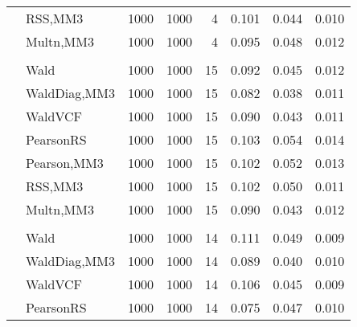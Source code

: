 \documentclass[
]{article}
\begin{document}
\begin{table}[H]
{\begin{tabular}[t]{llrrrrrr}
\hspace{1em} & RSS,MM3 & 1000 & 1000 & 4 & 0.101 & 0.044 & 0.010\\

\hspace{1em} & Multn,MM3 & 1000 & 1000 & 4 & 0.095 & 0.048 & 0.012\\
\cmidrule{1-8}
\addlinespace[0.3em]
\multicolumn{8}{l}{\textbf{1F 15V}}\\
\hspace{1em} & Wald & 1000 & 1000 & 15 & 0.092 & 0.045 & 0.012\\

\hspace{1em} & WaldDiag,MM3 & 1000 & 1000 & 15 & 0.082 & 0.038 & 0.011\\

\hspace{1em} & WaldVCF & 1000 & 1000 & 15 & 0.090 & 0.043 & 0.011\\

\hspace{1em} & PearsonRS & 1000 & 1000 & 15 & 0.103 & 0.054 & 0.014\\

\hspace{1em} & Pearson,MM3 & 1000 & 1000 & 15 & 0.102 & 0.052 & 0.013\\

\hspace{1em} & RSS,MM3 & 1000 & 1000 & 15 & 0.102 & 0.050 & 0.011\\

\hspace{1em} & Multn,MM3 & 1000 & 1000 & 15 & 0.090 & 0.043 & 0.012\\
\cmidrule{1-8}
\addlinespace[0.3em]
\multicolumn{8}{l}{\textbf{2F 10V}}\\
\hspace{1em} & Wald & 1000 & 1000 & 14 & 0.111 & 0.049 & 0.009\\

\hspace{1em} & WaldDiag,MM3 & 1000 & 1000 & 14 & 0.089 & 0.040 & 0.010\\

\hspace{1em} & WaldVCF & 1000 & 1000 & 14 & 0.106 & 0.045 & 0.009\\

\hspace{1em} & PearsonRS & 1000 & 1000 & 14 & 0.075 & 0.047 & 0.010\\


\end{tabular}}
\end{table}
\end{document}
